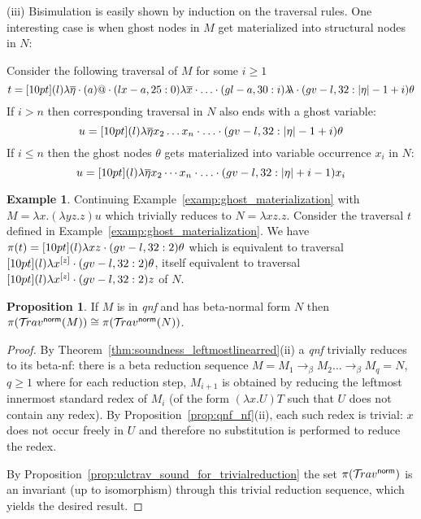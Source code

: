 \documentclass{article}
\theoremstyle{definition}
\newtheorem{proposition}{Proposition}[section]
\newtheorem{example}{Example}[section]
\newcommand{\ghostlmd}{{\lambda\!\!\lambda}}
\newcommand{\ghostvar}{\theta}
\newcommand{\normalizing}{{\sf norm}}
\newcommand{\travsetnorm}{\travset^\normalizing}
\def\coresymbol{\pi} %
\newcommand{\core}[1]{\coresymbol(#1)} %
\begin{document}
\begin{description}
    (iii) Bisimulation is easily shown by induction on the traversal rules. One interesting case is when ghost nodes in $M$ get materialized into structural nodes in $N$:

    Consider the following traversal of $M$ for some $i\geq1$
    $$t = \Pstr[10pt]{
        (l){\lambda\overline\eta} \cdot (a)@ \cdot (lx-a,25:0){\lambda\overline{x}} \cdot \ldots \cdot (gl-a,30:i)\ghostlmd \cdot (gv-l,32:{|\eta|-1+i})\ghostvar }
    $$
    If $i>n$ then corresponding traversal in $N$
    also ends with a ghost variable:
    $$u = \Pstr[10pt]{
        (l){\lambda\overline\eta x_2 \ldots x_n} \cdot \ldots \cdot  (gv-l,32:{|\eta|-1+i})\ghostvar }
    $$
    If $i\leq n$ then the ghost nodes $\ghostvar$ gets materialized into variable occurrence $x_i$ in $N$:
    $$u = \Pstr[10pt]{
        (l){\lambda\overline\eta x_2\cdots x_n} \cdot \ldots \cdot  (gv-l,32:{|\eta|+i-1}){x_i} }
    $$
    \end{description}
\endproofatend

\begin{example}
    Continuing Example~\ref{examp:ghost_materialization} with $M = \lambda x. (\lambda y z.z) u$ which trivially reduces to $N = \lambda x z . z$. Consider the traversal $t$ defined in Example~\ref{examp:ghost_materialization}. We have $\coresymbol(t) = \Pstr[10pt]{ (l){\lambda x z} \cdot (gv-l,32:2)\ghostvar }$ which is equivalent to traversal
$\Pstr[10pt]{(l){\lambda x^{[z]}} \cdot (gv-l,32:2)\ghostvar }$, itself equivalent to traversal $\Pstr[10pt]{ (l){\lambda x^{[z]}} \cdot (gv-l,32:2){z} }$ of $N$.
\end{example}


\begin{proposition}
\label{prop:qnf_and_nf_traveset_invariant}
If $M$ is in \emph{qnf} and has beta-normal form $N$ then $\coresymbol(\travsetnorm(M)) \cong \coresymbol(\travsetnorm(N))$.
\end{proposition}
\begin{proof}
By Theorem~\ref{thm:soundness_leftmostlinearred}(ii) a \emph{qnf} trivially reduces to its beta-nf: there is a beta reduction sequence $M = M_1 \rightarrow_\beta M_2 \ldots \rightarrow_\beta M_q= N$, $q\geq1$  where for each reduction step, $M_{i+1}$ is obtained by reducing the leftmost innermost standard redex of $M_i$ (of the form $(\lambda x . U) T$ such that $U$ does not contain any redex). By Proposition~\ref{prop:qnf_nf}(ii), each such redex is trivial: $x$ does not occur freely in $U$ and therefore no substitution is performed to reduce the redex.

By Proposition~\ref{prop:ulctrav_sound_for_trivialreduction} the set $\core{\travsetnorm}$ is an invariant (up to isomorphism) through this trivial reduction sequence, which yields the desired result.
\end{proof}
\end{document}
